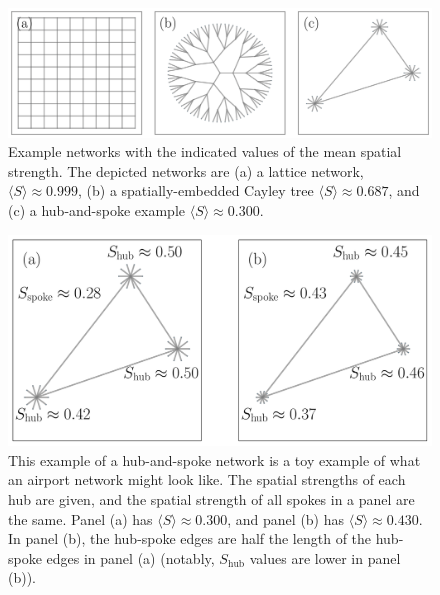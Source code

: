 \documentclass[%
 reprint,
 amsmath,amssymb,
 aps,
]{revtex4-1}
\begin{document}
\begin{figure}
    \centering
    \includegraphics[width=1.0\linewidth]{toy_network_examples.pdf}
    \caption{Example networks with the indicated values of the mean spatial strength. The depicted networks are (a) a lattice network, $\langle S \rangle \approx 0.999$, (b) a spatially-embedded Cayley tree $\langle S \rangle \approx 0.687$, and (c) a hub-and-spoke example $\langle S \rangle \approx 0.300$.
    }
    \label{fig:toy_network_examples}
\end{figure}

\begin{figure}
    \centering
    \includegraphics[width=1.0\linewidth]{hub_spoke_detailed2.pdf}
    \caption{
   This example of a hub-and-spoke network is a toy example of what an airport network might look like. The spatial strengths of each hub are given, and the spatial strength of all spokes in a panel are the same. Panel (a) has $\langle S \rangle \approx 0.300$, and panel (b) has $\langle S \rangle \approx 0.430$. In panel (b), the hub-spoke edges are half the length of the hub-spoke edges in panel (a) (notably, $S_{\text{hub}}$ values are lower in panel (b)).
    }
    \label{fig:hub_spoke_example}
\end{figure}
\end{document}

